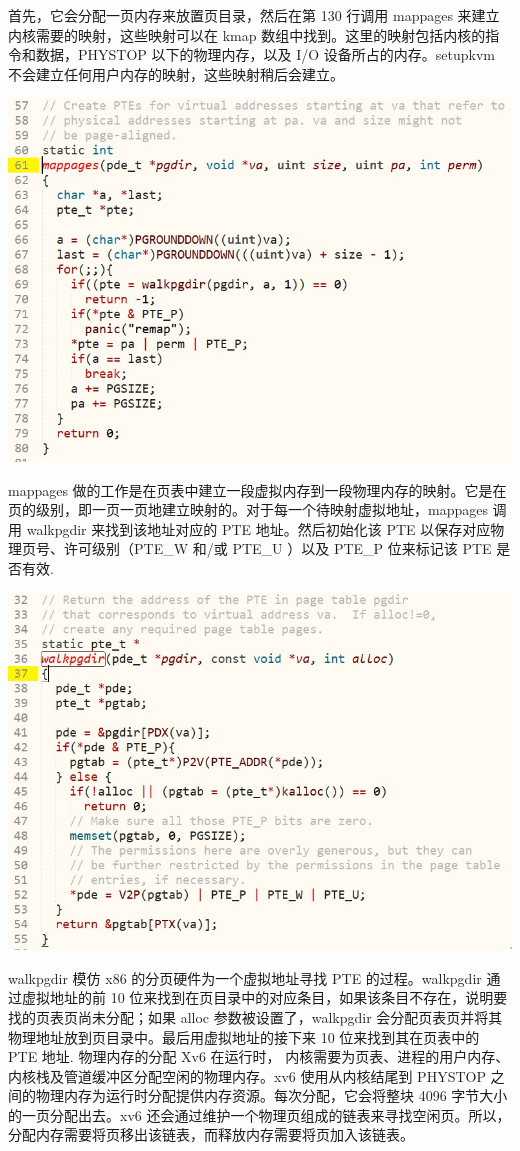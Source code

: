 首先，它会分配一页内存来放置页目录，然后在第 130 行调用 mappages 来建立内核需要的映射，这些映射可以在 kmap 数组中找到。这里的映射包括内核的指令和数据，PHYSTOP 以下的物理内存，以及 I/O 设备所占的内存。setupkvm 不会建立任何用户内存的映射，这些映射稍后会建立。

\includegraphics[width=6in]{figures/mem/fig8.png}

mappages 做的工作是在页表中建立一段虚拟内存到一段物理内存的映射。它是在页的级别，即一页一页地建立映射的。对于每一个待映射虚拟地址，mappages 调用 walkpgdir 来找到该地址对应的 PTE 地址。然后初始化该 PTE 以保存对应物理页号、许可级别（PTE\_W 和/或 PTE\_U ）以及 PTE\_P 位来标记该 PTE 是否有效.

\includegraphics[width=6in]{figures/mem/fig9.png}

walkpgdir 模仿 x86 的分页硬件为一个虚拟地址寻找 PTE 的过程。walkpgdir 通过虚拟地址的前 10 位来找到在页目录中的对应条目，如果该条目不存在，说明要找的页表页尚未分配；如果 alloc 参数被设置了，walkpgdir 会分配页表页并将其物理地址放到页目录中。最后用虚拟地址的接下来 10 位来找到其在页表中的 PTE 地址. 物理内存的分配 Xv6 在运行时， 内核需要为页表、进程的用户内存、内核栈及管道缓冲区分配空闲的物理内存。xv6 使用从内核结尾到 PHYSTOP 之间的物理内存为运行时分配提供内存资源。每次分配，它会将整块
4096 字节大小的一页分配出去。xv6 还会通过维护一个物理页组成的链表来寻找空闲页。所以，分配内存需要将页移出该链表，而释放内存需要将页加入该链表。
